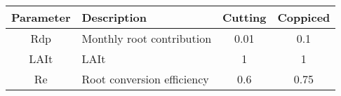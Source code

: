 \begin{tabularx}{\linewidth}{|cXcc|}
  \hline
  Parameter & Description & Cutting & Coppiced\\
\hline
\acs{Rdp} & Monthly root contribution & 0.01 & 0.1\\
\ac{LAIt} & \acf{LAIt} & 1 & 1\\
\acs{Re} & Root conversion efficiency & 0.6 & 0.75\\
\hline
\end{tabularx}

